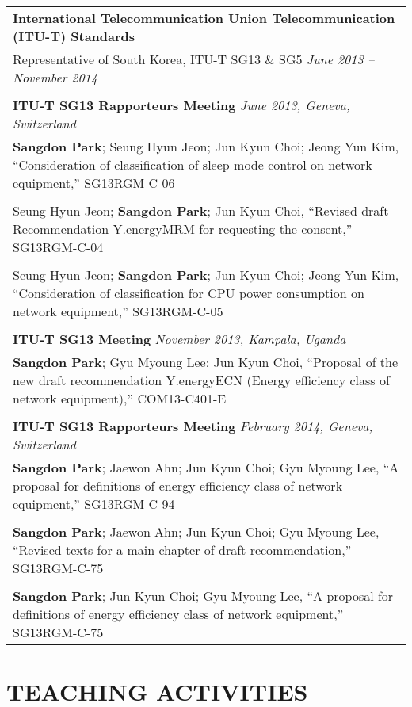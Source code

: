 \documentclass[11pt,a4paper]{article}
\begin{document}
\begin{tabularx}{\textwidth}{X}
\textbf{International Telecommunication Union Telecommunication (ITU-T) Standards} \\[0.2cm]
Representative of South Korea, ITU-T SG13 \& SG5 \hfill \textit{June 2013 -- November 2014}\\
\\[0.3cm]
\textbf{ITU-T SG13 Rapporteurs Meeting} \hfill \textit{June 2013, Geneva, Switzerland}
\\[0.2cm]
\textbf{Sangdon Park}; Seung Hyun Jeon; Jun Kyun Choi; Jeong Yun Kim, ``Consideration of classification of sleep mode control on network equipment,'' SG13RGM-C-06 \\[-0.2cm]
\\
Seung Hyun Jeon; \textbf{Sangdon Park}; Jun Kyun Choi, ``Revised draft Recommendation Y.energyMRM for requesting the consent,'' SG13RGM-C-04 \\[-0.2cm]
\\
Seung Hyun Jeon; \textbf{Sangdon Park}; Jun Kyun Choi; Jeong Yun Kim, ``Consideration of classification for CPU power consumption on network equipment,'' SG13RGM-C-05 \\
\\[0.3cm]
\textbf{ITU-T SG13 Meeting} \hfill \textit{November 2013, Kampala, Uganda} \\[0.2cm]
\textbf{Sangdon Park}; Gyu Myoung Lee; Jun Kyun Choi, ``Proposal of the new draft recommendation Y.energyECN (Energy efficiency class of network equipment),'' COM13-C401-E \\
\\[0.3cm]
\textbf{ITU-T SG13 Rapporteurs Meeting} \hfill \textit{February 2014, Geneva, Switzerland} \\[0.2cm]
\textbf{Sangdon Park}; Jaewon Ahn; Jun Kyun Choi; Gyu Myoung Lee, ``A proposal for definitions of energy efficiency class of network equipment,'' SG13RGM-C-94 \\[-0.2cm]
\\
\textbf{Sangdon Park}; Jaewon Ahn; Jun Kyun Choi; Gyu Myoung Lee, ``Revised texts for a main chapter of draft recommendation,'' SG13RGM-C-75 \\[-0.2cm]
\\
\textbf{Sangdon Park}; Jun Kyun Choi; Gyu Myoung Lee, ``A proposal for definitions of energy efficiency class of network equipment,'' SG13RGM-C-75 \\
\end{tabularx}

\section{TEACHING ACTIVITIES}
\end{document}
